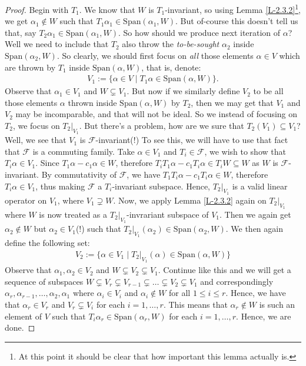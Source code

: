 \documentclass[letterpaper,11pt,twoside]{article}
\theoremstyle{definition}
\theoremstyle{definition}
\theoremstyle{definition}
\theoremstyle{definition}
\theoremstyle{definition}
\theoremstyle{definition}
\theoremstyle{remark}
\theoremstyle{definition}
\newcommand{\rest}[2]{\left. { #1 }\right \vert_{#2}}
\newcommand{\Span}[1]{\text{Span}\left(#1\right)}
\begin{document}
\begin{proof}
    Begin with $T_1$. We know that $W$ is $T_1$-invariant, so using Lemma \ref{L-2.3.2}\footnote{At this point it should be clear that how important this lemma actually is.}, we get $\alpha_1\notin W$ such that $T_1\alpha_1 \in \Span{\alpha_1,W}$. But of-course this doesn't tell us that, say $T_2\alpha_1 \in \Span{\alpha_1,W}$. So how should we produce next iteration of $\alpha$? Well we need to include that $T_2$ also throw the \textit{to-be-sought} $\alpha_2$ inside $\Span{\alpha_2,W}$. So clearly, we should first focus on \textit{all} those elements $\alpha \in V$ which are thrown by $T_1$ inside $\Span{\alpha,W}$, that is, denote:
    \begin{align*}
        V_1 := \{\alpha \in V\;\vert\; T_1\alpha \in \Span{\alpha, W}\}.
    \end{align*}
    Observe that $\alpha_1 \in V_1 $ and $W\subsetneq V_1$. But now if we similarly define $V_2$ to be all those elements $\alpha$ thrown inside $\Span{\alpha,W}$ by $T_2$, then we may get that $V_1$ and $V_2$ may be incomparable, and that will not be ideal. So we instead of focusing on $T_2$, we focus on $\rest{T_2}{V_1} $. But there's a problem, how are we sure that $T_2(V_1)\subseteq V_1$? Well, we see that $V_1$ is $\mathcal{F}$-invariant(!) To see this, we will have to use that fact that $\mathcal{F}$ is a commuting family. Take $\alpha\in V_1$ and $T_i\in \mathcal{F}$, we wish to show that $T_i\alpha \in V_1$. Since $T_1\alpha -c_1\alpha \in W$, therefore $T_iT_1\alpha -c_1T_i\alpha \in T_iW \subseteq W$ as $W$ is $\mathcal{F}$-invariant. By commutativity of $\mathcal{F}$, we have $T_1T_i\alpha -c_1T_i\alpha \in W$, therefore $T_i\alpha \in V_1$, thus making $\mathcal{F}$ a $T_i$-invariant subspace. Hence, $\rest{T_2}{V_1}$ is a valid linear operator on $V_1$, where $V_1\supsetneq W$. Now, we apply Lemma \ref{L-2.3.2} again on $\rest{T_2}{V_1}$ where $W$ is now treated as a $\rest{T_2}{V_1}$-invrariant subspace of $V_1$. Then we again get $\alpha_2 \notin W$ but $\alpha_2\in V_1$(!) such that $\rest{T_2}{V_1}(\alpha_2) \in \Span{\alpha_2,W}$. We then again define the following set:
    \begin{align*}
        V_2:= \{\alpha\in V_1\;\vert\; \rest{T_2}{V_1}(\alpha) \in \Span{\alpha,W}\}
    \end{align*}
    Observe that $\alpha_1,\alpha_2\in V_2$ and $W\subsetneq V_2 \subsetneq V_1$. Continue like this and we will get a sequence of subspaces $W\subsetneq V_r \subsetneq V_{r-1} \subsetneq \dots \subsetneq V_2 \subsetneq V_1$ and correspondingly $\alpha_r,\alpha_{r-1},\dots,\alpha_2,\alpha_1$ where $\alpha_i \in V_i$ and $\alpha_i \notin W$ for all $1\le i\le r$. Hence, we have that $\alpha_r\in V_r $ and $V_r \subsetneq V_i$ for each $i=1,\dots, r$. This means that $\alpha_r\notin W$ is such an element of $V$ such that $T_i \alpha_r\in \Span{\alpha_r,W}$ for each $i=1,\dots,r$. Hence, we are done. 
 \end{proof}
\end{document}
